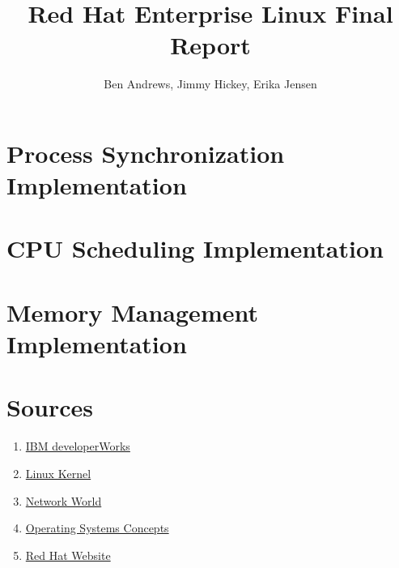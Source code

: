 \documentclass[12pt]{article}
\title{Red Hat Enterprise Linux Final Report}
\author{Ben Andrews, Jimmy Hickey, Erika Jensen}
\begin{document}
\maketitle
\tableofcontents
\clearpage

\doublespacing

\section{Process Synchronization Implementation}

\section{CPU Scheduling Implementation}

\section{Memory Management Implementation}

\pagebreak
\section*{Sources}
\singlespacing
\begin{enumerate}
\item\href{https://www.ibm.com/developerworks/learn/}{IBM developerWorks}
\item\href{https://github.com/torvalds/linux}{Linux Kernel}
\item\href{https://www.networkworld.com/article/2597777/software/162275-10-things-you-need-to-know-about-Red-Hat-Enterprise-Linux-7.html}{Network World}
\item\href{https://www.amazon.com/Operating-System-Concepts-Abraham-Silberschatz/dp/1118129385}{Operating Systems Concepts}
\item\href{https://access.redhat.com/}{Red Hat Website}
\end{enumerate}
\end{document}
